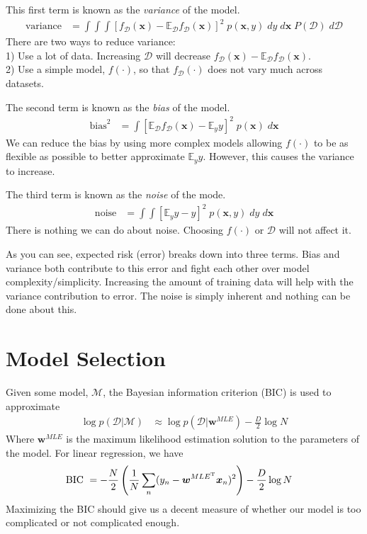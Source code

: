 \documentclass[11pt]{article}
\newcommand{\vct}[1]{\boldsymbol{#1}} %
\newcommand{\T}{^{\textrm T}} %
\newcommand{\ProbOpr}[1]{\mathbb{#1}}
\begin{document}
This first term is known as the {\it variance} of the model. 
\begin{align*}
\text{variance}&=\int \int \int [f_{\mathcal{D}}(\vct{x})-\ProbOpr{E}_{\mathcal{D}} f_{\mathcal{D}}(\vct{x})]^2 \;p(\vct{x},y) \;dy \;d\vct{x}\; P(\mathcal{D})\;d\mathcal{D}
\end{align*}
There are two ways to reduce variance:\\
1) Use a lot of data. Increasing $\mathcal{D}$ will decrease $f_{\mathcal{D}}(\vct{x})-\ProbOpr{E}_{\mathcal{D}} f_{\mathcal{D}}(\vct{x})$. \\
2) Use a simple model, $f(\cdot)$, so that $f_{\mathcal{D}}(\cdot)$ does not vary much across datasets.

The second term is known as the {\it bias} of the model.
\begin{align*}
\text{bias}^2 &= \int  [\ProbOpr{E}_{\mathcal{D}} f_{\mathcal{D}}(\vct{x}) - \ProbOpr{E}_y y]^2 \;p(\vct{x}) \;d\vct{x}
\end{align*}
We can reduce the bias by using more complex models allowing $f(\cdot)$ to be as flexible as possible to better approximate $\ProbOpr{E}_y y$. However, this causes the variance to increase.

The third term is known as the {\it noise} of the mode.
\begin{align*}
\text{noise} &= \int \int  [\ProbOpr{E}_y y - y]^2 \;p(\vct{x},y) \;dy \;d\vct{x}
\end{align*}
There is nothing we can do about noise. Choosing $f(\cdot)$ or $\mathcal{D}$ will not affect it.

As you can see, expected risk (error) breaks down into three terms. Bias and variance both contribute to this error and fight each other over model complexity/simplicity. Increasing the amount of training data will help with the variance contribution to error. The noise is simply inherent and nothing can be done about this.


\section{Model Selection}
Given some model, $\mathcal{M}$, the Bayesian information criterion (BIC) is used to approximate
\begin{align*}
\log p(\mathcal{D}|\mathcal{M}) &\approx \log p(\mathcal{D}|\vct{w}^{MLE}) - \frac{D}{2}\log N
\end{align*}
Where $\vct{w}^{MLE}$ is the maximum likelihood estimation solution to the parameters of the model. For linear regression, we have
\begin{align*}
\text{BIC } &= -\frac{N}{2}\left(\frac{1}{N}\sum_n(y_n - \vct{w}^{MLE\T}\vct{x}_n)^2 \right) - \frac{D}{2}\log N
\end{align*}
Maximizing the BIC should give us a decent measure of whether our model is too complicated or not complicated enough.
\end{document}
